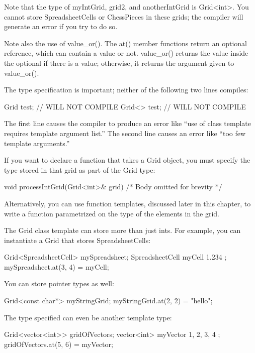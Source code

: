 Note that the type of myIntGrid, grid2, and anotherIntGrid is Grid<int>. You cannot store SpreadsheetCells or ChessPieces in these grids; the compiler will generate an error if you try to do so.

Note also the use of value\_or(). The at() member functions return an optional reference, which can contain a value or not. value\_or() returns the value inside the optional if there is a value; otherwise, it returns the argument given to value\_or().

The type specification is important; neither of the following two lines compiles:

\begin{cpp}
Grid test; // WILL NOT COMPILE
Grid<> test; // WILL NOT COMPILE
\end{cpp}

The first line causes the compiler to produce an error like “use of class template requires template argument list.” The second line causes an error like “too few template arguments.”

If you want to declare a function that takes a Grid object, you must specify the type stored in that grid as part of the Grid type:

\begin{cpp}
void processIntGrid(Grid<int>& grid) { /* Body omitted for brevity */ }
\end{cpp}

Alternatively, you can use function templates, discussed later in this chapter, to write a function parametrized on the type of the elements in the grid.

The Grid class template can store more than just ints. For example, you can instantiate a Grid that stores SpreadsheetCells:

\begin{cpp}
Grid<SpreadsheetCell> mySpreadsheet;
SpreadsheetCell myCell { 1.234 };
mySpreadsheet.at(3, 4) = myCell;
\end{cpp}

You can store pointer types as well:

\begin{cpp}
Grid<const char*> myStringGrid;
myStringGrid.at(2, 2) = "hello";
\end{cpp}

The type specified can even be another template type:

\begin{cpp}
Grid<vector<int>> gridOfVectors;
vector<int> myVector { 1, 2, 3, 4 };
gridOfVectors.at(5, 6) = myVector;
\end{cpp}

